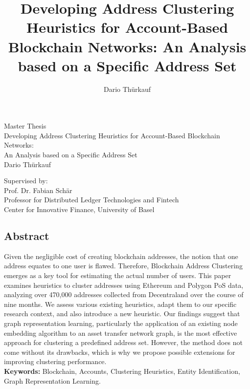 \documentclass[12pt,a4paper,titlepage,oneside,english]{article}
\title{Developing Address Clustering Heuristics for Account-Based Blockchain Networks: An Analysis based on a Specific Address Set}
\author{Dario Thürkauf}
\begin{document}
\begin{titlepage}
\begin{center}
\vspace{1em}
\large{Master Thesis}\\
\LARGE Developing Address Clustering Heuristics for Account-Based Blockchain Networks:\\ An Analysis based on a Specific Address Set \\
\Large \vspace{1em}
Dario Thürkauf
\end{center}

\vspace{1em}
\normalsize
\begin{flushleft}
Supervised by: \\
Prof. Dr. Fabian Schär \\ 
Professor for Distributed Ledger Technologies and Fintech \\
Center for Innovative Finance, University of Basel
\end{flushleft}

\vspace{1em}
\onehalfspacing
\begin{center}
\section*{Abstract}
\end{center}
Given the negligible cost of creating blockchain addresses, the notion that one address equates to one user is flawed. Therefore, Blockchain Address Clustering emerges as a key tool for estimating the actual number of users. This paper examines heuristics to cluster addresses using Ethereum and Polygon PoS data, analyzing over 470,000 addresses collected from Decentraland over the course of nine months. We assess various existing heuristics, adapt them to our specific research context, and also introduce a new heuristic. Our findings suggest that graph representation learning, particularly the application of an existing node embedding algorithm to an asset transfer network graph, is the most effective approach for clustering a predefined address set. However, the method does not come without its drawbacks, which is why we propose possible extensions for improving clustering performance. \\ %

\vfill
\textbf{Keywords:} Blockchain, Accounts, Clustering Heuristics, Entity Identification, Graph Representation Learning.\\
\end{titlepage}
\end{document}
